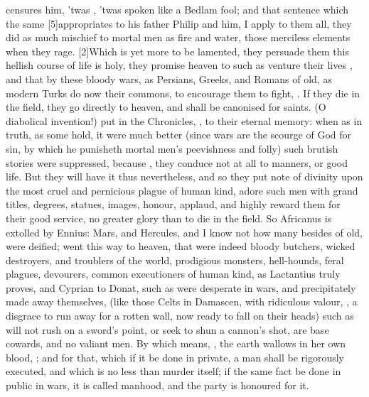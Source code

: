 {censures him, 'twas , 'twas spoken like a
Bedlam fool; and that sentence which the same [5\baselineskip]\Seneca appropriates
to his father Philip and him, I apply to them all,  they
did as much mischief to mortal men as fire and water, those merciless
elements when they rage. [2\baselineskip]Which is yet more to be lamented, they
persuade them this hellish course of life is holy, they promise heaven
to such as venture their lives , and that by these bloody
wars, as Persians, Greeks, and Romans of old, as modern Turks do now
their commons, to encourage them to fight, . If
they die in the field, they go directly to heaven, and shall be
canonised for saints. (O diabolical invention!) put in the Chronicles,
, to their eternal memory: when as in truth,
as some hold, it were much better (since wars are the scourge of
God for sin, by which he punisheth mortal men's peevishness and folly)
such brutish stories were suppressed, because , they conduce not at all to manners, or good life. But
they will have it thus nevertheless, and so they put note of
divinity upon the most cruel and pernicious plague of human kind,
adore such men with grand titles, degrees, statues, images,
honour, applaud, and highly reward them for their good service, no
greater glory than to die in the field. So Africanus is extolled by
Ennius: Mars, and Hercules, and I know not how many besides of
old, were deified; went this way to heaven, that were indeed bloody
butchers, wicked destroyers, and troublers of the world, prodigious
monsters, hell-hounds, feral plagues, devourers, common executioners of
human kind, as Lactantius truly proves, and Cyprian to Donat, such as
were desperate in wars, and precipitately made away themselves, (like
those Celts in Damascen, with ridiculous valour, , a disgrace to run away for a rotten
wall, now ready to fall on their heads) such as will not rush on a
sword's point, or seek to shun a cannon's shot, are base cowards, and
no valiant men. By which means, , the earth
wallows in her own blood,
; and for that, which
if it be done in private, a man shall be rigorously executed, and
which is no less than murder itself; if the same fact be done in public
in wars, it is called manhood, and the party is honoured for it.

}
